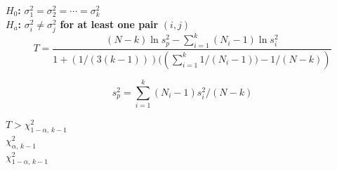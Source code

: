 \documentclass[12pt]{article}
\begin{document}
\pagestyle{empty}
\Large
{}
\pagecolor{ehandbook}

\boldmath

$H_0${\bf :}  $\sigma_1^2 = \sigma_2^2 = \cdots = \sigma_k^2$ \\
 
$H_a${\bf :}  $\sigma_i^2 \ne \sigma_j^2$ {\bf for at least one pair} $(i,j)$ \\

\[
T = \frac{(N-k) \ln{s^{2}_{p}} - \sum_{i=1}^{k}(N_{i} - 1)\ln{s^{2}_{i}}}{1 + (1/(3(k-1)))((\sum_{i=1}^{k}{1/(N_{i} - 1))} - 1/(N-k))}
\]
\vspace*{.25in}

\[
s^{2}_{p} = \sum_{i=1}^{k}(N_{i} - 1)s^{2}_{i}/(N-k)
\]
\vspace*{.25in}
 
$T > \chi^2_{1-\alpha, \, k-1}$ \\
 
$\chi^2_{\alpha, \, k-1}$ \\

$\chi^2_{1-\alpha, \, k-1}$ \\   
\end{document}
